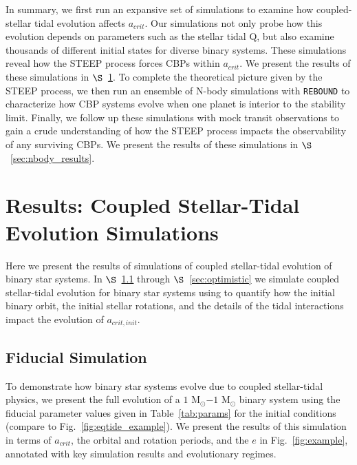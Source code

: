 In summary, we first run an expansive set of \vplanet simulations to examine how coupled-stellar tidal evolution affects $a_{crit}$.  Our simulations not only probe how this evolution depends on parameters such as the stellar tidal Q, but also examine thousands of different initial states for diverse binary systems.  These simulations reveal how the STEEP process forces CBPs within $a_{crit}$.  We present the results of these simulations in $\S$~\ref{sec:results}.  To complete the theoretical picture given by the STEEP process, we then run an ensemble of N-body simulations with \texttt{REBOUND} to characterize how CBP systems evolve when one planet is interior to the stability limit.  Finally, we follow up these simulations with mock transit observations to gain a crude understanding of how the STEEP process impacts the observability of any surviving CBPs.  We present the results of these simulations in $\S$~\ref{sec:nbody_results}.


\section{Results: Coupled Stellar-Tidal Evolution Simulations} \label{sec:results}

Here we present the results of simulations of coupled stellar-tidal evolution of binary star systems.  In $\S$~\ref{sec:fiducial_simulation} through $\S$~\ref{sec:optimistic} we simulate coupled stellar-tidal evolution for binary star systems using \vplanet to quantify how the initial binary orbit, the initial stellar rotations, and the details of the tidal interactions impact the evolution of $a_{crit,init}$.

\subsection{Fiducial Simulation} \label{sec:fiducial_simulation}

To demonstrate how binary star systems evolve due to coupled stellar-tidal physics, we present the full evolution of a $1$ M$_{\odot}$$-1$ M$_{\odot}$ binary system using the fiducial parameter values given in Table~\ref{tab:params} for the initial conditions (compare to Fig.~\ref{fig:eqtide_example}).  We present the results of this simulation in terms of $a_{crit}$, the orbital and rotation periods, and the $e$ in Fig.~\ref{fig:example}, annotated with key simulation results and evolutionary regimes.

